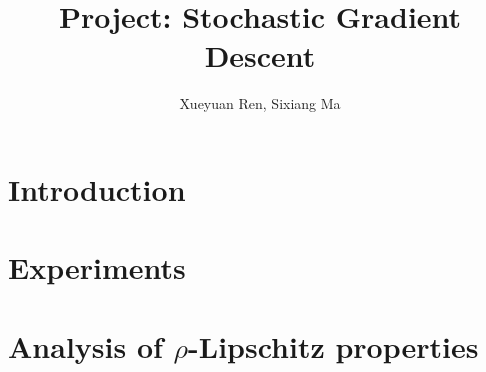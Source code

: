 \documentclass[11pt]{article}
\title{Project: Stochastic Gradient Descent}
\author{Xueyuan Ren, Sixiang Ma}
\date{}
\begin{document}
\maketitle

\section{Introduction}

\section{Experiments}

\section{Analysis of $\rho$-Lipschitz properties}
\end{document}
